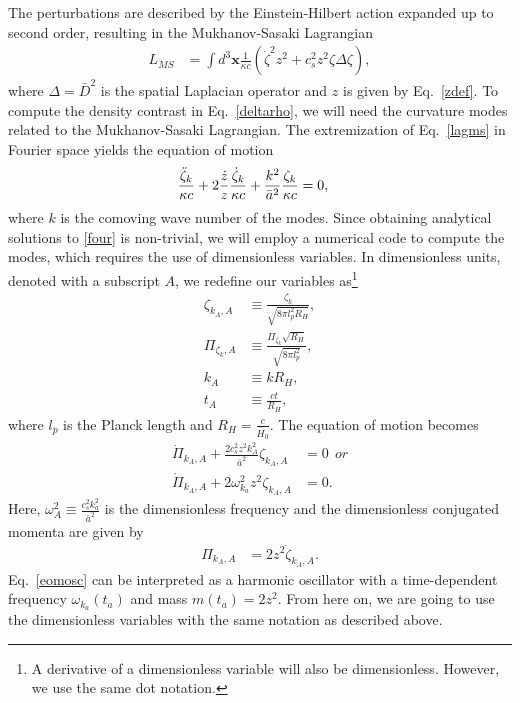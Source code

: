 \documentclass[a4paper,11pt]{article}
\begin{document}
The perturbations are described by the Einstein-Hilbert action expanded up to second order, resulting in the Mukhanov-Sasaki Lagrangian
\begin{align}
	\label{lagms}
	L_{MS} &= \int d^3\textbf{x} \frac{1}{ \kappa c} \left({\dot{\zeta}}^2 z^2 + c_s^2 z^2 \zeta\Delta \zeta\right)
	,\end{align}
where $\Delta = \bar{D}^2$ is the spatial Laplacian operator and $z$ is given by Eq.~\eqref{zdef}.
To compute the density contrast in Eq.~\eqref{deltarho}, we will need the curvature modes related to the Mukhanov-Sasaki Lagrangian. The extremization of Eq.~\eqref{lagms} in Fourier space yields the equation of motion
\begin{align}
	\label{four}
	\frac{\Ddot{\zeta}_{k}}{\kappa c}+ 2\frac{ \dot{z} }{ z } \frac{\dot{\zeta}_k}{\kappa c} + \frac{k^2}{\bar{a}^2} \frac{ \zeta_k }{ \kappa c} &=0
	,\end{align}
where $k$ is the comoving wave number of the modes. Since obtaining analytical solutions to \eqref{four} is non-trivial, we will employ a numerical code to compute the modes, which requires the use of dimensionless variables. In dimensionless units, denoted with a subscript $A$, we redefine our variables as\footnote{A derivative of a dimensionless variable will also be dimensionless. However, we use the same dot notation.}
 \begin{align}
     \zeta_{k_A, A} &\equiv \frac{\zeta_{k}}{\sqrt{ 8 \pi l_p^2 R_H}}, \\
          \Pi_{\zeta_k, A} &\equiv \frac{\Pi_{\zeta_k} \sqrt{R_H}}{\sqrt{8 \pi l_p^2}}, \\
          \label{kadm}
     k_A &\equiv k R_H, \\
     t_A &\equiv \frac{ct}{R_H} 
 ,\end{align}
 where $l_p$ is the Planck length and $R_H = \frac{c}{\bar{H}_0}$. The equation of motion becomes
  \begin{align}
  \label{eomosc}
     	\dot{\Pi}_{k_A, A}+  \frac{2 c^2_s z^2 k_A^2}{\bar{a}^2  } \zeta_{k_A, A} &=0 \nonumber~~ or\\
           \dot{\Pi}_{k_A, A}+  2 \omega_{k_a}^2 z^2  \zeta_{k_A, A} &=0 
 .\end{align}
 Here, $\omega_A^2 \equiv \frac{c_s^2 k_a^2}{\bar{a}^2}$ is the dimensionless frequency and the dimensionless conjugated momenta are given by
  \begin{align}
     \Pi_{k_A, A} &= 2 z^2 \dot{\zeta}_{k_A, A}
 .\end{align}
Eq.~\eqref{eomosc} can be interpreted as a harmonic oscillator with a time-dependent frequency $\omega_{k_a}(t_a)$ and mass $m(t_a) = 2z^2$. From here on, we are going to use the dimensionless variables with the same notation as described above.
\end{document}
